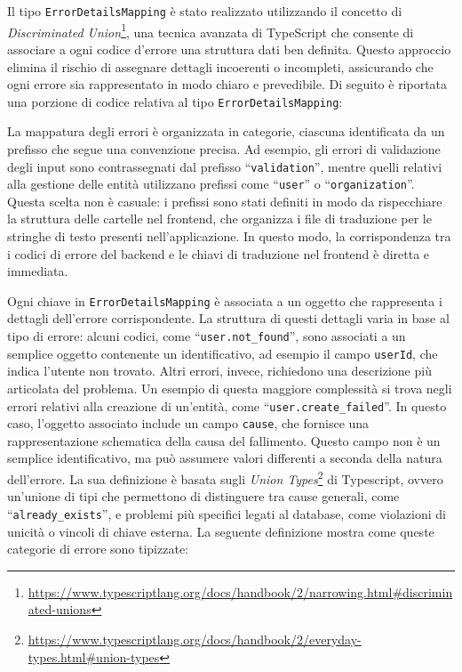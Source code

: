 Il tipo \texttt{ErrorDetailsMapping} è stato realizzato utilizzando il concetto di \textit{Discriminated Union}\footnote{\url{https://www.typescriptlang.org/docs/handbook/2/narrowing.html\#discriminated-unions}}, una tecnica avanzata di TypeScript che consente di associare a ogni codice d’errore una struttura dati ben definita. Questo approccio elimina il rischio di assegnare dettagli incoerenti o incompleti, assicurando che ogni errore sia rappresentato in modo chiaro e prevedibile.
%
Di seguito è riportata una porzione di codice relativa al tipo \texttt{ErrorDetailsMapping}:


%
La mappatura degli errori è organizzata in categorie, ciascuna identificata da un prefisso che segue una convenzione precisa. Ad esempio, gli errori di validazione degli input sono contrassegnati dal prefisso ``\texttt{validation}'', mentre quelli relativi alla gestione delle entità utilizzano prefissi come ``\texttt{user}'' o ``\texttt{organization}''. Questa scelta non è casuale: i prefissi sono stati definiti in modo da rispecchiare la struttura delle cartelle nel frontend, che organizza i file di traduzione per le stringhe di testo presenti nell’applicazione. In questo modo, la corrispondenza tra i codici di errore del backend e le chiavi di traduzione nel frontend è diretta e immediata.

Ogni chiave in \texttt{ErrorDetailsMapping} è associata a un oggetto che rappresenta i dettagli dell’errore corrispondente. La struttura di questi dettagli varia in base al tipo di errore: alcuni codici, come ``\texttt{user.not\_found}'', sono associati a un semplice oggetto contenente un identificativo, ad esempio il campo \texttt{userId}, che indica l’utente non trovato. Altri errori, invece, richiedono una descrizione più articolata del problema.
%
Un esempio di questa maggiore complessità si trova negli errori relativi alla creazione di un'entità, come ``\texttt{user.create\_failed}''. In questo caso, l’oggetto associato include un campo \texttt{cause}, che fornisce una rappresentazione schematica della causa del fallimento. Questo campo non è un semplice identificativo, ma può assumere valori differenti a seconda della natura dell’errore. La sua definizione è basata sugli \textit{Union Types}\footnote{\url{https://www.typescriptlang.org/docs/handbook/2/everyday-types.html\#union-types}} di Typescript, ovvero un’unione di tipi che permettono di distinguere tra cause generali, come ``\texttt{already\_exists}'', e problemi più specifici legati al database, come violazioni di unicità o vincoli di chiave esterna.
%
La seguente definizione mostra come queste categorie di errore sono tipizzate:

